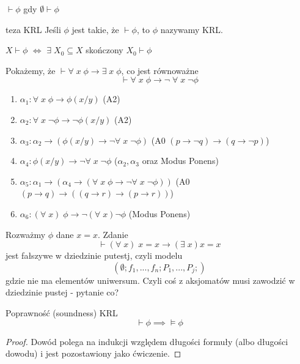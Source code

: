 \begin{konwencja}{}{}
  $\vdash \phi$ gdy $\emptyset\vdash\phi$
\end{konwencja}

\begin{definition}{teza KRL}{}
  Jeśli $\phi$ jest takie, że $\vdash\phi$, to $\phi$ nazywamy  KRL.
\end{definition}

\begin{remark}{}{}
  $X\vdash \phi$ $\iff$ $\exists\;X_0\subseteq X$ skończony $X_0\vdash \phi$
\end{remark}

\begin{example}
  Pokażemy, że $\vdash \forall\;x\;\phi\to\exists\;x\;\phi$, co jest równoważne
  $$\vdash \forall\;x\;\phi\to \neg\;\forall\;x\;\neg\phi$$
  
  \begin{enumerate}
    \item $\alpha_1:\forall\;x\;\phi\to \phi(x/y)$ (A2)
    \item $\alpha_2:\forall\;x\;\neg\phi\to\neg\phi(x/y)$ (A2)
    \item $\alpha_3:\alpha_2\to (\phi(x/y)\to \neg\forall\;x\;\neg\phi)$ (A0 $(p\to\neg q)\to(q\to\neg p)$)
    \item $\alpha_4:\phi(x/y)\to\neg\forall\;x\;\neg\phi$ ($\alpha_2,\alpha_3$ oraz Modus Ponens)
    \item $\alpha_5:\alpha_1\to(\alpha_4\to (\forall\;x\;\phi\to\neg\forall\;x\;\neg\phi))$ (A0 $(p\to q)\to((q\to r)\to(p\to r))$)
    \item $\alpha_6:(\forall\;x)\;\phi\to\neg(\forall\;x)\neg\phi$ (Modus Ponens)
  \end{enumerate}
\end{example}

Rozważmy $\phi$ dane $x=x$. Zdanie
$$\vdash(\forall\;x)\;x=x\to(\exists\;x)x=x$$
jest fałszywe w dziedzinie putestj, czyli modelu
$$(\emptyset; f_1,...,f_n; P_1,...,P_j;)$$
gdzie nie ma elementów uniwersum. Czyli coś z aksjomatów musi zawodzić w dziedzinie pustej - pytanie co?


\begin{center}
\end{center}

\begin{remark}{}{}
  Poprawność (soundness) KRL
  $$\vdash\phi\implies \models\phi$$
\end{remark}
\begin{proof}
  Dowód polega na indukcji względem długości formuły (albo długości dowodu) i jest pozostawiony jako ćwiczenie.
\end{proof}

